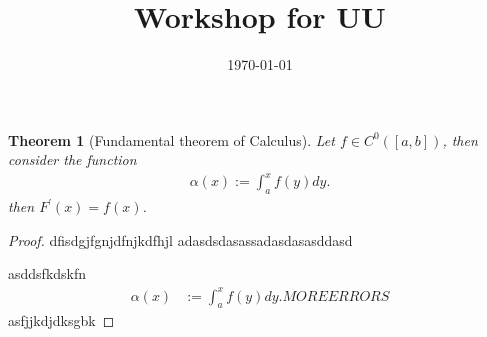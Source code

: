 \documentclass[reqno]{amsart}
\title{Workshop for UU}
\author{}
\date{\today}
\newtheorem{theorem}{Theorem}
\newcommand{\<}{\langle}
\renewcommand{\>}{\rangle}
\renewcommand{\>}{\rangle}
\begin{document}
\maketitle

\begin{theorem}[Fundamental theorem of Calculus]
  Let $f \in C^0([a,b])$, then consider the function
%
\begin{align*}
  \alpha(x):=
  \int_{a}^x f(y)  dy.
\end{align*}
% 
then $F^\prime(x)=f(x)$. 

\end{theorem}
\begin{proof}
dfisdgjfgnjdfnjkdfhjl adasdsdasassadasdasasddasd

asddsfkdskfn
\begin{align*}
  \alpha(x)
&:=
  \int_{a}^x f(y)  dy.
  MORE ERRORS
\end{align*}
asfjjkdjdksgbk
\end{proof}


%
%
\end{document}
